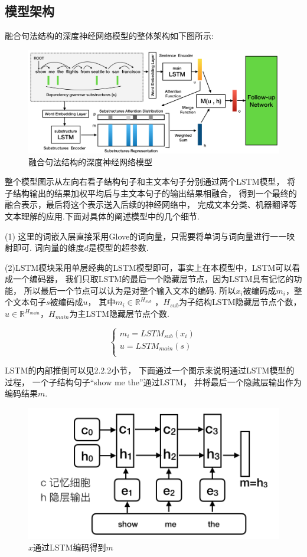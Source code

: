\documentclass[bachelor,adobefonts]{jnuthesis}
\begin{document}
\subsection{模型架构}
融合句法结构的深度神经网络模型的整体架构如下图所示:
\begin{figure}[h!]
  \centering
  \includegraphics[width=0.95\linewidth]{model.png}
  \caption{融合句法结构的深度神经网络模型}
\end{figure}

整个模型图示从左向右看子结构句子和主文本句子分别通过两个LSTM模型，
将子结构输出的结果加权平均后与主文本句子的输出结果相融合，
得到一个最终的融合表示，最后将这个表示送入后续的神经网络中，
完成文本分类、机器翻译等文本理解的应用.下面对具体的阐述模型中的几个细节.

(1) 这里的词嵌入层直接采用Glove的词向量，只需要将单词与词向量进行一一映射即可.
词向量的维度$d$是模型的超参数.

(2)LSTM模块采用单层经典的LSTM模型即可，事实上在本模型中，LSTM可以看成一个编码器，
我们只取LSTM的最后一个隐藏层节点，因为LSTM具有记忆的功能，
所以最后一个节点可以认为是对整个输入文本的编码.
所以$x_{i}$被编码成$m_{i}$，整个文本句子$s$被编码成$u$，
其中$m_{i} \in \mathbb{R}^{H_{sub}}$ ，$H_{sub}$为子结构LSTM隐藏层节点个数，
$u \in \mathbb{R}^{H_{main}}$，$H_{main}$为主LSTM隐藏层节点个数.

\begin{equation}
\left\{
  \begin{array}{l}
   m_{i} = LSTM_{sub}(x_{i}) \\ 
   u = LSTM_{main}(s) \\ 
  \end{array}
  \right.
\end{equation}

LSTM的内部推倒可以见2.2.2小节，
下面通过一个图示来说明通过LSTM模型的过程，
一个子结构句子“show me the”通过LSTM，
并将最后一个隐藏层输出作为编码结果$m$.

\begin{figure}[h!]
  \centering
  \includegraphics[width=0.5\linewidth]{LSTMjuti.png}
  \caption{$x$通过LSTM编码得到$m$}
\end{figure}
\end{document}
